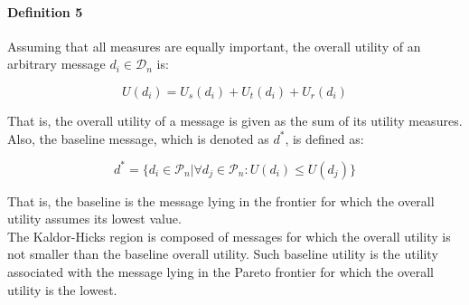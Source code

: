 \documentclass{sig-alternate}
\begin{document}
\paragraph*{\bf{Definition 5}} Assuming that all measures are equally important, the overall utility of an arbitrary message $d_i\in\mathcal{D}_n$ is:

\begin{equation}
\label{eq:cost}
U(d_i)=U_s(d_i)+U_t(d_i)+U_r(d_i)
\end{equation}

\noindent That is, the overall utility of a message is given as the sum of its utility measures. Also, the baseline message, which is denoted as $d^*$, is defined as:

\begin{equation}
d^*=\{d_i\in\mathcal{P}_n | \forall d_j\in\mathcal{P}_n: U(d_i)\leq U(d_j)\}
\end{equation}

\noindent That is, the baseline is the message lying in the frontier for which the overall utility assumes its lowest value.\\

The Kaldor-Hicks region is composed of messages for which the overall utility is not smaller than the baseline overall utility. Such baseline utility is the utility associated with the message lying in the Pareto frontier for which the overall utility is the lowest.

\end{document}
